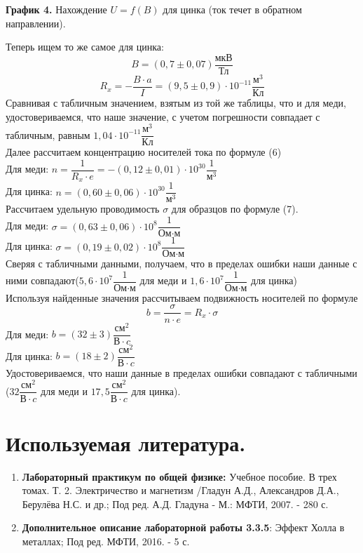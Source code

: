 \documentclass[a4paper, 12pt]{article}%
\begin{document}
\begin{center}
\textbf{График 4.} Нахождение $U = f(B)$ для цинка (ток течет в обратном направлении).
\end{center}
Теперь ищем то же самое для цинка: 
\[B = (0,7 \pm 0,07) \dfrac{\text{мкВ}}{\text{Тл}}\]
\[R_x = - \dfrac{B \cdot a}{I} = (9,5 \pm 0,9) \cdot 10^{-11} \dfrac{\text{м}^3}{\text{Кл}}\]
Сравнивая с табличным значением, взятым из той же таблицы, что и для меди, удостовериваемся, что наше значение, с учетом погрешности совпадает с табличным, равным $1,04 \cdot 10^{-11} \dfrac{\text{м}^3}{\text{Кл}}$\\
Далее рассчитаем концентрацию носителей тока по формуле (6)\\
Для меди: $ n = \dfrac{1}{R_x \cdot e} = -(0,12 \pm 0,01) \cdot 10^{30} \dfrac{1}{\text{м}^3}$\\
Для цинка: $n = (0,60 \pm 0,06) \cdot 10^{30} \dfrac{1}{\text{м}^3}$\\
Рассчитаем удельную проводимость $\sigma$ для образцов по формуле (7).\\
Для меди: $\sigma = (0,63 \pm 0,06) \cdot 10^8 \dfrac{1}{\text{Ом} \cdot \text{м}}$\\
Для цинка: $\sigma = (0,19 \pm 0,02)\cdot 10^8 \dfrac{1}{\text{Ом} \cdot \text{м}}$\\
Сверяя с табличными данными, получаем, что в пределах ошибки наши данные с ними совпадают($5,6 \cdot 10^7 \dfrac{1}{\text{Ом} \cdot \text{м}}$ для меди и $1,6 \cdot 10^7 \dfrac{1}{\text{Ом} \cdot \text{м}}$ для цинка)\\
Используя найденные значения рассчитываем подвижность носителей по формуле 
\[b = \dfrac{\sigma}{n \cdot e} = R_x \cdot \sigma\]
Для меди: $b = (32 \pm 3) \dfrac{\text{см}^2}{\text{В} \cdot c}$\\
Для цинка: $b = (18 \pm 2) \dfrac{\text{см}^2}{\text{В} \cdot c}$\\
Удостовериваемся, что наши данные в пределах ошибки совпадают с табличными ($32 \dfrac{\text{см}^2}{\text{В} \cdot c}$ для меди и $17,5 \dfrac{\text{см}^2}{\text{В} \cdot c}$ для цинка).
\section*{Используемая литература.}
\begin{enumerate}
\item \textbf{Лабораторный практикум по общей физике:} Учебное пособие. В трех томах. Т. 2. Электричество и магнетизм /Гладун А.Д., Александров Д.А., Берулёва Н.С. и др.; Под ред. А.Д. Гладуна - М.: МФТИ, 2007. - 280 с.
\item \textbf{Дополнительное описание лабораторной работы 3.3.5}: Эффект Холла в металлах; Под ред. МФТИ, 2016. - 5 с.
\end{enumerate}
\end{document}
